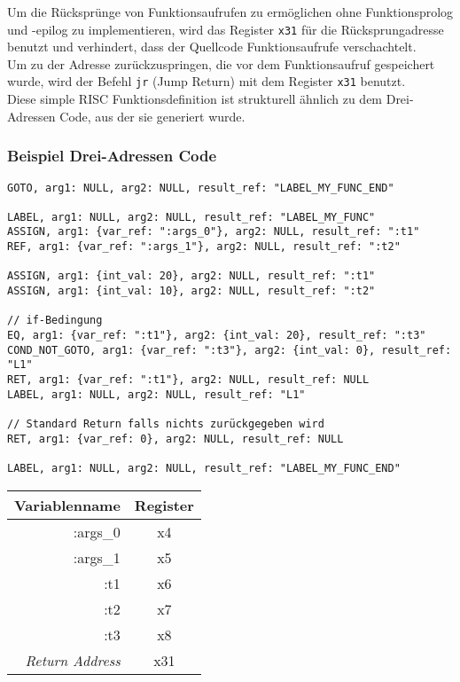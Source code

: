 Um die Rücksprünge von Funktionsaufrufen zu ermöglichen ohne Funktionsprolog und -epilog zu implementieren, wird das Register \texttt{x31} für die Rücksprungadresse benutzt und verhindert, dass der Quellcode Funktionsaufrufe verschachtelt.\\
Um zu der Adresse zurückzuspringen, die vor dem Funktionsaufruf gespeichert wurde, wird der Befehl \texttt{jr} (Jump Return) mit dem Register \texttt{x31} benutzt\cite{waterman:2017}.\\
Diese simple RISC Funktionsdefinition ist strukturell ähnlich zu dem Drei-Adressen Code, aus der sie generiert wurde.

\subsubsection{Beispiel Drei-Adressen Code}

\begin{lstlisting}[caption={Drei-Adressen Code Funktionsdeklaration}]
GOTO, arg1: NULL, arg2: NULL, result_ref: "LABEL_MY_FUNC_END"

LABEL, arg1: NULL, arg2: NULL, result_ref: "LABEL_MY_FUNC"
ASSIGN, arg1: {var_ref: ":args_0"}, arg2: NULL, result_ref: ":t1"
REF, arg1: {var_ref: ":args_1"}, arg2: NULL, result_ref: ":t2"

ASSIGN, arg1: {int_val: 20}, arg2: NULL, result_ref: ":t1"
ASSIGN, arg1: {int_val: 10}, arg2: NULL, result_ref: ":t2"

// if-Bedingung
EQ, arg1: {var_ref: ":t1"}, arg2: {int_val: 20}, result_ref: ":t3"
COND_NOT_GOTO, arg1: {var_ref: ":t3"}, arg2: {int_val: 0}, result_ref: "L1"
RET, arg1: {var_ref: ":t1"}, arg2: NULL, result_ref: NULL
LABEL, arg1: NULL, arg2: NULL, result_ref: "L1"

// Standard Return falls nichts zurückgegeben wird
RET, arg1: {var_ref: 0}, arg2: NULL, result_ref: NULL

LABEL, arg1: NULL, arg2: NULL, result_ref: "LABEL_MY_FUNC_END"
\end{lstlisting}

\begin{table}[H]
  \begin{center}
    \begin{tabular}{| r | c |}
      \hline
      Variablenname & Register \\
      \hline
      :args\_0 & x4 \\
      :args\_1 & x5 \\
      :t1 & x6 \\
      :t2 & x7 \\
      :t3 & x8 \\
      \textit{Return Address} & x31 \\
      \hline
    \end{tabular}
  \end{center}
\end{table}

